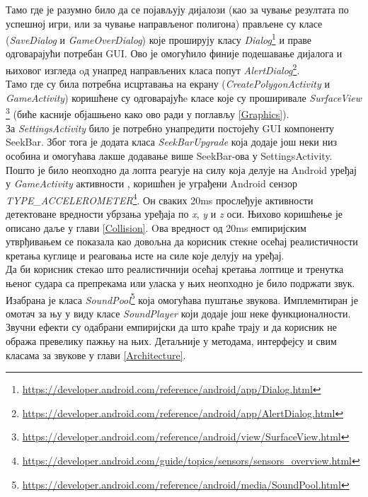 Тамо где је разумно било да се појављују дијалози (као за чување резултата по успешној игри, или за чување направљеног полигона) прављене су класе (\emph{SaveDialog} и \emph{GameOverDialog}) које проширују класу 
 \emph{Dialog}\footnote{\url{https://developer.android.com/reference/android/app/Dialog.html}} и праве одговарајући потребан GUI. 
 Ово је омогућило финије подешавање дијалога и њиховог изгледа oд унапред направљених класа попут \emph{AlertDialog}\footnote{\url{https://developer.android.com/reference/android/app/AlertDialog.html}}.
\\ \indent 
Тамо где су била потребна исцртавања на екрану (\emph{CreatePolygonActivity} и \emph{GameActivity}) коришћене су одговарајућe класе које су проширивале \emph{SurfaceView} \footnote{\url{https://developer.android.com/reference/android/view/SurfaceView.html}} (биће касније објашњено како ово ради у поглављу \ref{Graphics}). 
\\ \indent 
За \emph{SettingsActivity} било је потребно  унапредити постојећу GUI компоненту SeekBar. Због тога је додата класа \emph{SeekBarUpgrade} која додаје још неки низ особина и омогућава лакше додавање више SeekBar-ова у SettingsActivity. 
\\ \indent 
Пошто је било неопходно да лопта реагује на силу која делује на Android уређај у \emph{GameActivity} активности , коришћен је уграђени Android сензор 
\emph{TYPE\_ACCELEROMETER}\footnote{\url{https://developer.android.com/guide/topics/sensors/sensors_overview.html}}.
Он сваких \si{20ms} прослеђује активности  детектоване вредности убрзања уређаја по \emph{x}, \emph{y} и \emph{z} оси. Њихово коришћење је описано даље у глави \ref{Collision}. Oва вредност од \si{20ms} емпиријским утврђивањем се показала као довољна да корисник стекне осећај реалистичности кретања куглице и реаговања исте на силе које делују на уређај. 
\\ \indent 
Да би корисник стекао што реалистичнији осећај кретања лоптице и тренутка њеног судара са препрекама или уласка у њих неопходно је било подржати звук. Изабрана је класа \emph{SoundPool}\footnote{\url{https://developer.android.com/reference/android/media/SoundPool.html}} која омогућава пуштање звукова. Имплемнтиран је омотач за њу у виду класе \emph{SoundPlayer} који додаје још неке функционалности. Звучни ефекти су одабрани емпиријски да што краће трају и да корисник не обража превелику пажњу на њих. Детаљније у методама, интерфејсу и свим класама за звукове у глави \ref{Architecture}.

